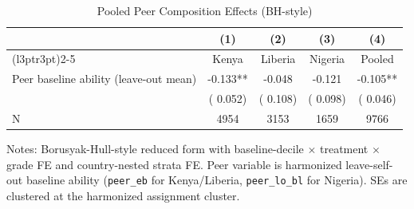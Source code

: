 \begin{table}[!htbp]
\centering
\caption{Pooled Peer Composition Effects (BH-style)}
\label{tab:pooled_peer_effects}
\begin{threeparttable}
\begin{tabular}[t]{lcccc}
\toprule
 & (1) & (2) & (3) & (4) \\
\cmidrule(l{3pt}r{3pt}){2-5}
 & Kenya & Liberia & Nigeria & Pooled \\
\midrule
Peer baseline ability (leave-out mean) &  -0.133** &  -0.048 &  -0.121 &  -0.105** \\
 & (  0.052) & (  0.108) & (  0.098) & (  0.046) \\
\addlinespace
N & 4954 & 3153 & 1659 & 9766 \\
\bottomrule
\end{tabular}
\begin{tablenotes}[para]
\item Notes: Borusyak-Hull-style reduced form with baseline-decile $\times$ treatment $\times$ grade FE and country-nested strata FE.
Peer variable is harmonized leave-self-out baseline ability (\texttt{peer\_eb} for Kenya/Liberia, \texttt{peer\_lo\_bl} for Nigeria). SEs are clustered at the harmonized assignment cluster.
\end{tablenotes}
\end{threeparttable}
\end{table}
